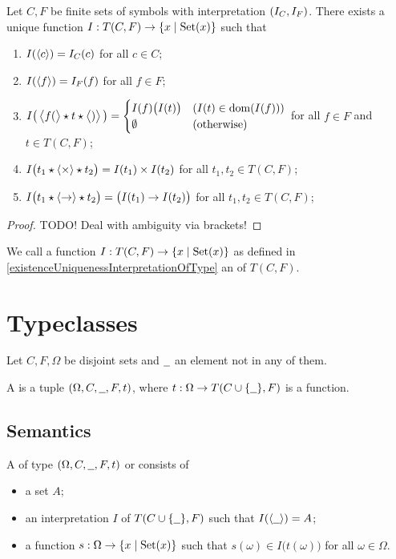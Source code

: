 \begin{proposition} \label{existenceUniquenessInterpretationOfType}
Let $C, F$ be finite sets of symbols with interpretation $\sSet{I_C, I_F}$. There exists a unique function $I: T(C,F) \to \setbuilder{x}{\Set(x)}$ such that
\begin{enumerate}
\item $I(\left\langle c \right\rangle) = I_C(c)$ for all $c\in C$;
\item $I(\left\langle f \right\rangle) = I_F(f)$ for all $f\in F$;
\item $I\big(\left\langle \big.f( \right\rangle\star t\star \left\langle \big.) \right\rangle\big) = \begin{cases}
I(f)\big(I(t)\big) & (I(t) \in \operatorname{dom}(I(f))) \\
\emptyset & (\text{otherwise})
\end{cases}$ for all $f\in F$ and $t\in T(C,F)$;
\item $I\big(t_1\star \left\langle \times \right\rangle \star t_2\big) = I(t_1)\times I(t_2)$ for all $t_1,t_2 \in T(C,F)$;
\item $I\big(t_1\star \left\langle \to \right\rangle \star t_2\big) = \big(I(t_1)\to I(t_2)\big)$ for all $t_1,t_2 \in T(C,F)$;
\end{enumerate}
\end{proposition}
\begin{proof}
TODO! Deal with ambiguity via brackets!
\end{proof}

\begin{definition}
We call a function $I: T(C,F) \to \setbuilder{x}{\Set(x)}$ as defined in \ref{existenceUniquenessInterpretationOfType} an  of $T(C,F)$.
\end{definition}


\section{Typeclasses}
\begin{definition}
Let $C,F, \Omega$ be disjoint sets and $\mathord{\underline{\hspace{.6em}}}$ an element not in any of them.

A  is a tuple $\sSet{\Omega, C, \blank,F,t}$, where $t: \Omega \to T(C\cup\{\mathord{\underline{\hspace{.6em}}}\},F)$ is a function.
\end{definition}

\subsection{Semantics}
\begin{definition}
A  of type $\sSet{\Omega, C, \blank,F,t}$ or  consists of
\begin{itemize}
\item a set $A$;
\item an interpretation $I$ of $T(C\cup\{\mathord{\underline{\hspace{.6em}}}\}, F)$ such that $I(\left\langle \mathord{\underline{\hspace{.6em}}} \right\rangle) = A$;
\item a function $s: \Omega \to \setbuilder{x}{\Set(x)}$ such that $s(\omega) \in I\big(t(\omega)\big)$ for all $\omega\in \Omega$.
\end{itemize}
\end{definition}

